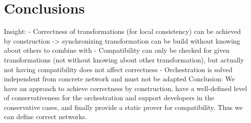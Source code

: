 \chapter{Conclusions }

Insight:
- Correctness of transformations (for local consistency) can be achieved by construction -> synchronizing transformation can be build without knowing about others to combine with
- Compatibility can only be checked for given transformations (not without knowing about other transformation), but actually not having compatibility does not affect correctness
- Orchestration is solved independent from concrete network and must not be adapted
Conclusion: We have an approach to achieve correctness by construction, have a well-defined level of conservativeness for the orchestration and support developers in the conservative cases, and finally provide a static prover for compatibility. Thus we can define correct networks.

